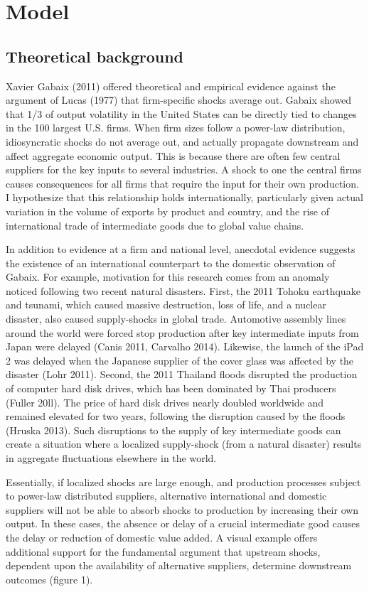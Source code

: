 \documentclass[10pt,letterpaper,pdftex]{article}
\begin{document}
\section{Model} \label{models}
\subsection{Theoretical background} \label{modelstheory}
Xavier Gabaix (2011) offered theoretical and empirical evidence against the argument of Lucas (1977) that firm-specific shocks average out. Gabaix showed that 1/3 of output volatility in the United States can be directly tied to changes in the 100 largest U.S. firms. When firm sizes follow a power-law distribution, idiosyncratic shocks do not average out, and actually propagate downstream and affect aggregate economic output. This is because there are often few central suppliers for the key inputs to several industries. A shock to one the central firms causes consequences for all firms that require the input for their own production. I hypothesize that this relationship holds internationally, particularly given actual variation in the volume of exports by product and country, and the rise of international trade of intermediate goods due to global value chains. 

In addition to evidence at a firm and national level, anecdotal evidence suggests the existence of an international counterpart to the domestic observation of Gabaix. For example, motivation for this research comes from an anomaly noticed following two recent natural disasters. First, the 2011 Tohoku earthquake and tsunami, which caused massive destruction, loss of life, and a nuclear disaster, also caused supply-shocks in global trade. Automotive assembly lines around the world were forced stop production after key intermediate inputs from Japan were delayed (Canis 2011, Carvalho 2014). Likewise, the launch of the iPad 2 was delayed when the Japanese supplier of the cover glass was affected by the disaster (Lohr 2011). Second, the 2011 Thailand floods disrupted the production of computer hard disk drives, which has been dominated by Thai producers (Fuller 20ll). The price of hard disk drives nearly doubled worldwide and remained elevated for two years, following the disruption caused by the floods (Hruska 2013). Such disruptions to the supply of key intermediate goods can create a situation where a localized supply-shock (from a natural disaster) results in aggregate fluctuations elsewhere in the world.

Essentially, if localized shocks are large enough, and production processes subject to power-law distributed suppliers, alternative international and domestic suppliers will not be able to absorb shocks to production by increasing their own output. In these cases, the absence or delay of a crucial intermediate good causes the delay or reduction of domestic value added. A visual example offers additional support for the fundamental argument that upstream shocks, dependent upon the availability of alternative suppliers, determine downstream outcomes (figure 1). 
\end{document}
